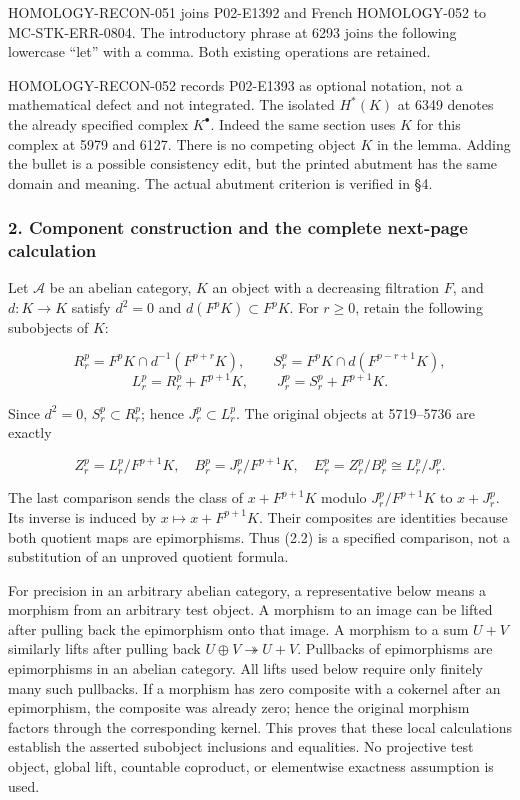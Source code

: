 \documentclass[11pt]{article}
\begin{document}
HOMOLOGY-RECON-051 joins P02-E1392 and French HOMOLOGY-052 to MC-STK-ERR-0804. The introductory phrase at 6293 joins the following lowercase ``let'' with a comma. Both existing operations are retained.

HOMOLOGY-RECON-052 records P02-E1393 as optional notation, not a mathematical defect and not integrated. The isolated \(H^*(K)\) at 6349 denotes the already specified complex \(K^\bullet\). Indeed the same section uses \(K\) for this complex at 5979 and 6127. There is no competing object \(K\) in the lemma. Adding the bullet is a possible consistency edit, but the printed abutment has the same domain and meaning. The actual abutment criterion is verified in §4.

\subsubsection{2. Component construction and the complete next-page calculation}\label{component-construction-and-the-complete-next-page-calculation}

Let \(\mathcal A\) be an abelian category, \(K\) an object with a decreasing filtration \(F\), and \(d:K\to K\) satisfy \(d^2=0\) and \(d(F^pK)\subset F^pK\). For \(r\geq0\), retain the following subobjects of \(K\):

\[
R_r^p=F^pK\cap d^{-1}(F^{p+r}K),\qquad
S_r^p=F^pK\cap d(F^{p-r+1}K),
\] \[
L_r^p=R_r^p+F^{p+1}K,\qquad
J_r^p=S_r^p+F^{p+1}K.                 \tag{2.1}
\]

Since \(d^2=0\), \(S_r^p\subset R_r^p\); hence \(J_r^p\subset L_r^p\). The original objects at 5719--5736 are exactly

\[
Z_r^p=L_r^p/F^{p+1}K,\quad B_r^p=J_r^p/F^{p+1}K,\quad
E_r^p=Z_r^p/B_r^p\cong L_r^p/J_r^p.       \tag{2.2}
\]

The last comparison sends the class of \(x+F^{p+1}K\) modulo \(J_r^p/F^{p+1}K\) to \(x+J_r^p\). Its inverse is induced by \(x\mapsto x+F^{p+1}K\). Their composites are identities because both quotient maps are epimorphisms. Thus (2.2) is a specified comparison, not a substitution of an unproved quotient formula.

For precision in an arbitrary abelian category, a representative below means a morphism from an arbitrary test object. A morphism to an image can be lifted after pulling back the epimorphism onto that image. A morphism to a sum \(U+V\) similarly lifts after pulling back \(U\oplus V\twoheadrightarrow U+V\). Pullbacks of epimorphisms are epimorphisms in an abelian category. All lifts used below require only finitely many such pullbacks. If a morphism has zero composite with a cokernel after an epimorphism, the composite was already zero; hence the original morphism factors through the corresponding kernel. This proves that these local calculations establish the asserted subobject inclusions and equalities. No projective test object, global lift, countable coproduct, or elementwise exactness assumption is used.
\end{document}
